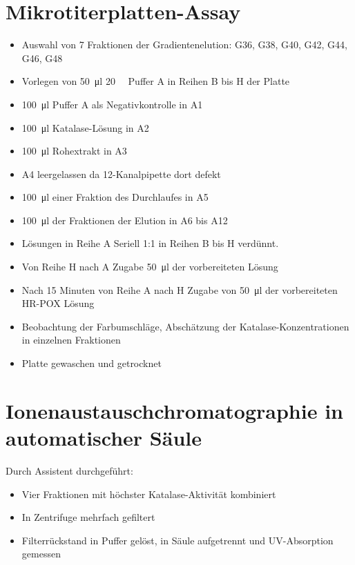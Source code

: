 \documentclass[a4paper,german]{scrreprt}
\begin{document}
\section{Mikrotiterplatten-Assay}

\begin{itemize}
	\item Auswahl von 7 Fraktionen der Gradientenelution: G36, G38, G40,
		G42, G44, G46, G48
	\item Vorlegen von \SI{50}{\ul} \SI{20}{\milli\Molar} Puffer A in
		Reihen B bis H der Platte
	\item \SI{100}{\ul} Puffer A als Negativkontrolle in A1
	\item \SI{100}{\ul} Katalase-Lösung in A2
	\item \SI{100}{\ul} Rohextrakt in A3
	\item A4 leergelassen da 12-Kanalpipette dort defekt
	\item \SI{100}{\ul} einer Fraktion des Durchlaufes in A5
	\item \SI{100}{\ul} der Fraktionen der Elution in A6 bis A12
	\item Lösungen in Reihe A Seriell 1:1 in Reihen B bis H verdünnt.
	\item Von Reihe H nach A Zugabe \SI{50}{\ul} der vorbereiteten
		 Lösung
	\item Nach 15 Minuten von Reihe A nach H Zugabe von \SI{50}{\ul} der
		vorbereiteten HR-POX Lösung
	\item Beobachtung der Farbumschläge, Abschätzung der
		Katalase-Konzentrationen in einzelnen Fraktionen
	\item Platte gewaschen und getrocknet
\end{itemize}

\section{Ionenaustauschchromatographie in automatischer Säule}

Durch Assistent durchgeführt:

\begin{itemize}
	\item Vier Fraktionen mit höchster Katalase-Aktivität kombiniert
	\item In Zentrifuge mehrfach gefiltert
	\item Filterrückstand in Puffer gelöst, in Säule aufgetrennt und
		UV-Absorption gemessen
\end{itemize}
\end{document}
